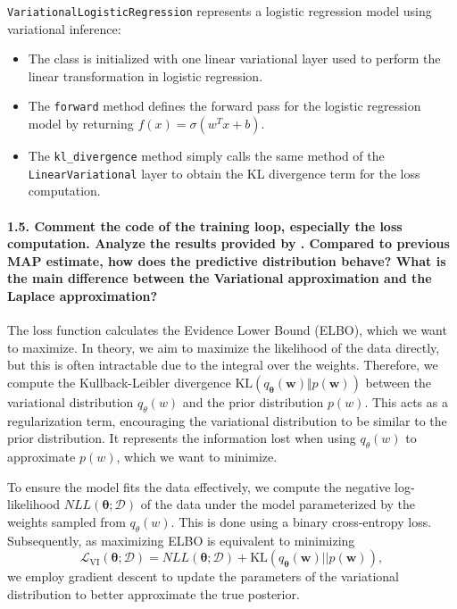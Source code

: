 \noindent\texttt{VariationalLogisticRegression} represents a logistic regression model using variational inference:
\begin{itemize}
    \item The class is initialized with one linear variational layer used to perform the linear transformation in logistic regression.
    \item The \texttt{forward} method defines the forward pass for the logistic regression model by returning $f(x) = \sigma(w^T x + b)$. 
    \item The \texttt{kl\_divergence} method simply calls the same method of the \texttt{LinearVariational} layer to obtain the KL divergence term for the loss computation.
\end{itemize}

\paragraph{1.5. Comment the code of the training loop, especially the loss computation. Analyze the results provided by . Compared to previous MAP estimate, how does the predictive distribution behave? What is the main difference between the Variational approximation and the Laplace approximation?}

The loss function calculates the Evidence Lower Bound (ELBO), which we want to maximize. In theory, we aim to maximize the likelihood of the data directly, but this is often intractable due to the integral over the weights. Therefore, we compute the Kullback-Leibler divergence $\textrm{KL}(q_{\boldsymbol{\theta}}(\boldsymbol{w}) \Vert p(\boldsymbol{w}))$ between the variational distribution $q_{\theta}(w)$ and the prior distribution $p(w)$. This acts as a regularization term, encouraging the variational distribution to be similar to the prior distribution. It represents the information lost when using $q_{\theta}(w)$ to approximate $p(w)$, which we want to minimize. 

To ensure the model fits the data effectively, we compute the negative log-likelihood $NLL(\boldsymbol{\theta}; \mathcal{D})$ of the data under the model parameterized by the weights sampled from $q_{\theta}(w)$. This is done using a binary cross-entropy loss. Subsequently, as maximizing ELBO is equivalent to minimizing\[ \mathcal{L}_{\textrm{VI}}(\boldsymbol{\theta}; \mathcal{D}) = NLL(\boldsymbol{\theta}; \mathcal{D}) + \textrm{KL}(q_{\boldsymbol{\theta}}(\boldsymbol{w})\vert\vert p(\boldsymbol{w})),\] we employ gradient descent to update the parameters of the variational distribution to better approximate the true posterior.

